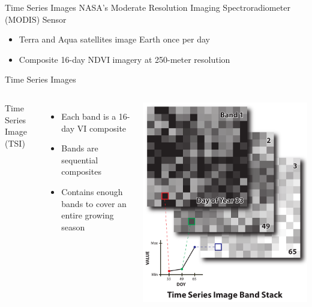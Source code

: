 \documentclass[  compress,xcolor={usenames,dvipsnames}]{beamer}
\begin{document}
\begin{frame}{Time Series Images}
NASA's Moderate Resolution Imaging Spectroradiometer (MODIS) Sensor
\begin{itemize}
  \item<2-> Terra and Aqua satellites image Earth once per day
  \item<3-> Composite 16-day NDVI imagery at 250-meter resolution
\end{itemize}
\end{frame}


\begin{frame}{Time Series Images}
\begin{columns}[c]
Time Series Image (TSI)
\begin{itemize}
  \item<+-> Each band is a 16-day VI composite
  \item<+-> Bands are sequential composites
  \item<+-> Contains enough bands to cover an entire growing season
\end{itemize}

  \includegraphics[width=1.1\textwidth,right]{Graphics/tsi_bands_2.pdf}
\end{columns}
\end{frame}
\end{document}
